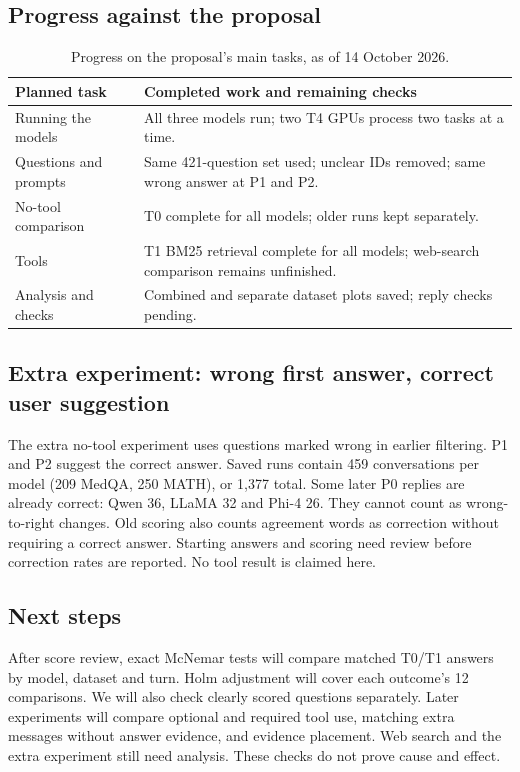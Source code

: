 \documentclass{article}
\begin{document}
\subsection{Progress against the proposal}
\begin{table}[ht]
\centering\small
\caption{Progress on the proposal's main tasks, as of 14 October 2026.}
\begin{tabular}{@{}p{1.45in}p{3.85in}@{}}
\toprule
Planned task & Completed work and remaining checks \\
\midrule
Running the models & All three models run; two T4 GPUs process two tasks at a time. \\
Questions and prompts & Same 421-question set used; unclear IDs removed; same wrong answer at P1 and P2. \\
No-tool comparison & T0 complete for all models; older runs kept separately. \\
Tools & T1 BM25 retrieval complete for all models; web-search comparison remains unfinished. \\
Analysis and checks & Combined and separate dataset plots saved; reply checks pending. \\
\bottomrule
\end{tabular}
\end{table}

\subsection{Extra experiment: wrong first answer, correct user suggestion}
The extra no-tool experiment uses questions marked wrong in earlier filtering. P1 and P2 suggest the correct answer. Saved runs contain 459 conversations per model (209 MedQA, 250 MATH), or 1,377 total. Some later P0 replies are already correct: Qwen 36, LLaMA 32 and Phi-4 26. They cannot count as wrong-to-right changes. Old scoring also counts agreement words as correction without requiring a correct answer. Starting answers and scoring need review before correction rates are reported. No tool result is claimed here.

\subsection{Next steps}
After score review, exact McNemar tests will compare matched T0/T1 answers by model, dataset and turn. Holm adjustment will cover each outcome's 12 comparisons. We will also check clearly scored questions separately. Later experiments will compare optional and required tool use, matching extra messages without answer evidence, and evidence placement. Web search and the extra experiment still need analysis. These checks do not prove cause and effect.
\end{document}
